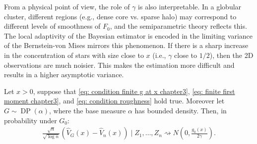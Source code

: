 From a physical point of view, the role of $\gamma$ is also interpretable. In a globular cluster, different regions (e.g., dense core vs. sparse halo) may correspond to different levels of smoothness of $F_0$, and the semiparametric theory reflects this. The local adaptivity of the Bayesian estimator is encoded in the limiting variance of the Bernstein-von Mises mirrors this phenomenon. If there is a sharp increase in the concentration of stars with size close to $x$ (i.e., $\gamma$ close to $1/2$), then the 2D observations are much noisier. This makes the estimation more difficult and results in a higher asymptotic variance. 

\begin{theorem}\label{thm: BvM}
	Let $x > 0$, suppose that \eqref{eq: condition finite g at x chapter3}, \eqref{eq: finite first moment chapter3}, and \eqref{eq: condition roughness} hold true. Moreover let $G \sim \operatorname{DP}(\alpha)$, where the base measure $\alpha$ has bounded density. Then, in probability under $G_0$: 
	\begin{align}\label{eq: claim}
		\frac{\sqrt{n}}{\sqrt{\log n}}\left(\hat{V}_{\scriptscriptstyle{G}}(x)-\hat{V}_n(x)\right) \mid Z_1, \ldots, Z_n \rightsquigarrow N\left(0, \frac{g_0(x)}{2 \gamma}\right).
	\end{align}
\end{theorem}
